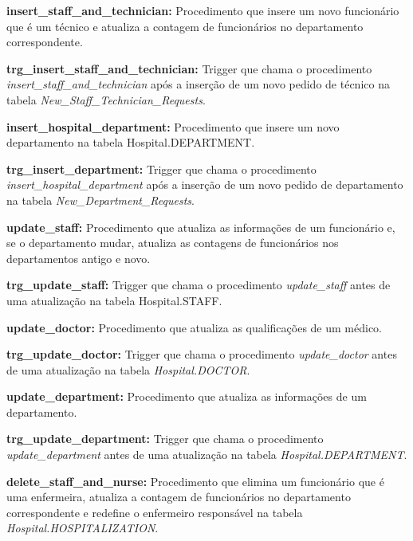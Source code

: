 \vspace{0.15cm}
\textbf{insert\_staff\_and\_technician:} Procedimento que insere um novo funcionário que é um técnico e atualiza a contagem de funcionários no departamento correspondente.

\vspace{0.15cm}
\textbf{trg\_insert\_staff\_and\_technician:} Trigger que chama o procedimento \textit{insert\_staff\_and\_technician} após a inserção de um novo pedido de técnico na tabela \textit{New\_Staff\_Technician\_Requests}.

\vspace{0.15cm}
\textbf{insert\_hospital\_department:} Procedimento que insere um novo departamento na tabela Hospital.DEPARTMENT.

\vspace{0.15cm}
\textbf{trg\_insert\_department:} Trigger que chama o procedimento \textit{insert\_hospital\_department} após a inserção de um novo pedido de departamento na tabela \textit{New\_Department\_Requests}.

\vspace{0.15cm}
\textbf{update\_staff:} Procedimento que atualiza as informações de um funcionário e, se o departamento mudar, atualiza as contagens de funcionários nos departamentos antigo e novo.

\vspace{0.15cm}
\textbf{trg\_update\_staff:} Trigger que chama o procedimento \textit{update\_staff} antes de uma atualização na tabela Hospital.STAFF.

\vspace{0.15cm}
\textbf{update\_doctor:} Procedimento que atualiza as qualificações de um médico.

\vspace{0.15cm}
\textbf{trg\_update\_doctor:} Trigger que chama o procedimento \textit{update\_doctor} antes de uma atualização na tabela \textit{Hospital.DOCTOR}.

\vspace{0.15cm}
\textbf{update\_department:} Procedimento que atualiza as informações de um departamento.

\vspace{0.15cm}
\textbf{trg\_update\_department:} Trigger que chama o procedimento \textit{update\_department} antes de uma atualização na tabela \textit{Hospital.DEPARTMENT}.

\vspace{0.15cm}
\textbf{delete\_staff\_and\_nurse:} Procedimento que elimina um funcionário que é uma enfermeira, atualiza a contagem de funcionários no departamento correspondente e redefine o enfermeiro responsável na tabela \textit{Hospital.HOSPITALIZATION}.

